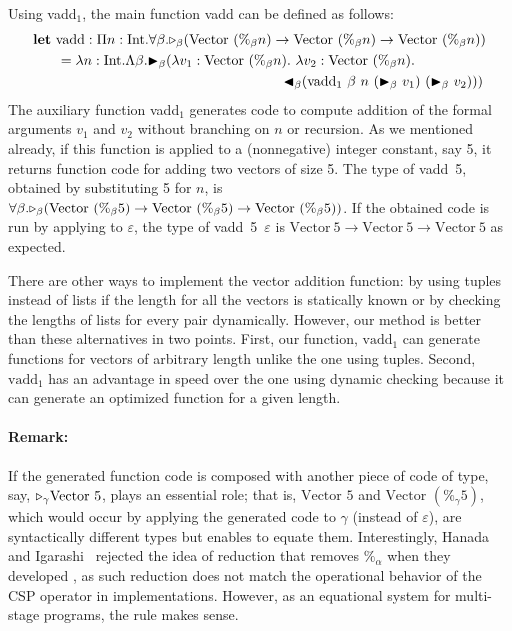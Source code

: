 Using vadd$_1$, the main function vadd can be defined as follows:
\renewcommand{\Vpn}{\text{Vector}\ (\%_\beta n)}
\begin{align*}
	  & \textbf{let}\ \text{vadd}: \Pi n:\I.\F\beta.\TW_\beta(\Vpn\to\Vpn\to\Vpn)                \\ 
	  & \hspace{6mm} = \lambda n:\I.\Lambda\beta.\TB_\beta (\lambda v_1:\Vpn.\ \lambda v_2:\Vpn. \\
	  & \hspace{63mm} \TBL_\beta (\text{vadd}_1\ \beta\ n\ (\TB_\beta\ v_1)\ (\TB_\beta\ v_2))) 
\end{align*}
\renewcommand{\Vpn}{\text{Vector}\ (\%_\beta 5)}%
The auxiliary function vadd$_1$ generates code to compute addition of
the formal arguments $v_1$ and $v_2$ without branching on $n$ or recursion.
As we mentioned already, if this function is applied to a
(nonnegative) integer constant, say 5, it returns function code for adding
two vectors of size 5.  The type of vadd\ 5, obtained by
substituting 5 for $n$, is
\( \F\beta.\TW_\beta(\Vpn\to\Vpn\to\Vpn) \).
\renewcommand{\Vpn}{\text{Vector}\ 5}
If the obtained code is run by applying to \(\varepsilon\),
the type of vadd\ 5\ \(\varepsilon\) is
\(\Vpn\to\Vpn\to\Vpn\) as expected.

There are other ways to implement the vector addition function: by using tuples
instead of lists if the length for all the vectors is statically known or by
checking the lengths of lists for every pair dynamically.  However, our method
is better than these alternatives in two points.  First, our function,
$\text{vadd}_1$ can generate functions for vectors of arbitrary length unlike
the one using tuples.  Second, $\text{vadd}_1$ has an advantage in speed over
the one using dynamic checking because it can generate an optimized function
for a given length.

\paragraph{Remark:}
If the generated function code is composed with another piece of code of type, say,
\({\mathop{\triangleright}}_\gamma \text{Vector }5\), \QPercent{} plays an essential role; that is,
\(\text{Vector }5\) and \(\text{Vector }(\%_\gamma 5)\), which would occur
by applying the generated code to \(\gamma\) (instead of \(\varepsilon\)), are syntactically
different types but \QPercent{} enables to equate them.
Interestingly, Hanada and Igarashi~\cite{HanadaIgarashi2014CSP} rejected the idea of
reduction that removes $\%_\alpha$ when they developed \LTP{}, as such
reduction does not match the operational behavior of the CSP operator in
implementations. However, as an equational system for multi-stage programs,
the rule \QPercent{} makes sense.

